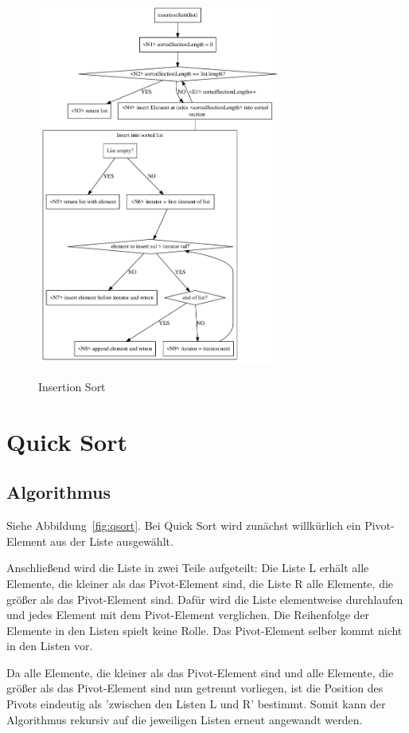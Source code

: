 \documentclass[11pt]{article}
\begin{document}
    \begin{figure}[hbt]
        \caption{Insertion Sort}
        \centering
        \includegraphics[width = 8cm]{insertionS}\label{fig:insertionS}
    \end{figure}


    \section{Quick Sort}\label{sec:quick-sort}

    \subsection{Algorithmus}\label{subsec:Qalgorithmus}
    Siehe Abbildung~\ref{fig:qsort}.
    Bei Quick Sort wird zunächst willkürlich ein Pivot-Element aus der Liste
    ausgewählt.

    Anschließend wird die Liste in zwei Teile aufgeteilt: Die Liste L erhält
    alle Elemente, die kleiner als das Pivot-Element sind, die Liste R alle
    Elemente, die größer als das Pivot-Element sind.
    Dafür wird die Liste elementweise durchlaufen und jedes Element mit dem
    Pivot-Element verglichen.
    Die Reihenfolge der Elemente in den Listen spielt keine Rolle.
    Das Pivot-Element selber kommt nicht in den Listen vor.

    Da alle Elemente, die kleiner als das Pivot-Element sind und alle Elemente,
    die größer als das Pivot-Element sind nun getrennt vorliegen, ist die
    Position des Pivots eindeutig als 'zwischen den Listen L und R' bestimmt.
    Somit kann der Algorithmus rekursiv auf die jeweiligen Listen erneut
    angewandt werden.
\end{document}
